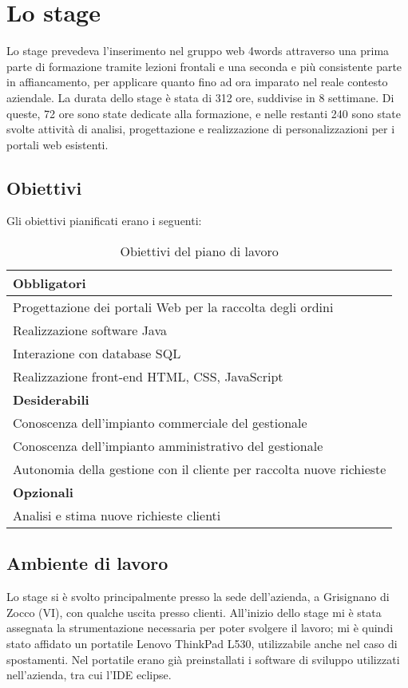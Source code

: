 \section{Lo stage}
Lo stage prevedeva l'inserimento nel gruppo web 4words attraverso una prima parte di formazione tramite lezioni frontali e una seconda e più consistente parte in affiancamento, per applicare quanto fino ad ora imparato nel reale contesto aziendale. La durata dello stage è stata di 312 ore, suddivise in 8 settimane. Di queste, 72 ore sono state dedicate alla formazione, e nelle restanti 240 sono state svolte attività di analisi, progettazione e realizzazione di personalizzazioni per i portali web esistenti.

\subsection{Obiettivi}
Gli obiettivi pianificati erano i seguenti:
\begin{table}[h]
	\centering
	\begin{tabular}{|l|}
		\hline
		\textbf{Obbligatori}\\
		\hline
		Progettazione dei portali Web per la raccolta degli ordini \\
		\hline
		Realizzazione software Java \\
		\hline
		Interazione con database SQL \\
		\hline
		Realizzazione front-end HTML, CSS, JavaScript \\
		\hline
		\textbf{Desiderabili}\\
		\hline
		Conoscenza dell'impianto commerciale del gestionale \\
		\hline
		Conoscenza dell'impianto amministrativo del gestionale \\
		\hline
		Autonomia della gestione con il cliente per raccolta nuove richieste \\
		\hline
		\textbf{Opzionali} \\
		\hline
		Analisi e stima nuove richieste clienti \\
		\hline
	\end{tabular}
	\caption{Obiettivi del piano di lavoro}
\end{table}
\subsection{Ambiente di lavoro}
Lo stage si è svolto principalmente presso la sede dell'azienda, a Grisignano di Zocco (VI), con qualche uscita presso clienti. All'inizio dello stage mi è stata assegnata la strumentazione necessaria per poter svolgere il lavoro; mi è quindi stato affidato un portatile Lenovo ThinkPad L530, utilizzabile anche nel caso di spostamenti. Nel portatile erano già preinstallati i software di sviluppo utilizzati nell'azienda, tra cui l'\Gls{IDE} \Gls{eclipse}.

